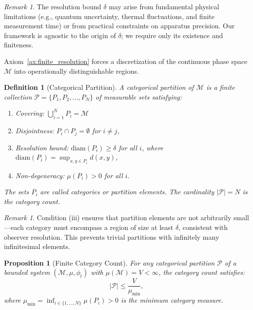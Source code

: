 \documentclass[twocolumn,10pt,a4paper]{article}
\newtheorem{proposition}[theorem]{Proposition}
\newtheorem{definition}[theorem]{Definition}
\theoremstyle{remark}
\newtheorem{remark}[theorem]{Remark}
\newcommand{\manifold}{\mathcal{M}}
\newcommand{\partition}{\mathcal{P}}
\begin{document}
\begin{remark}
The resolution bound $\delta$ may arise from fundamental physical limitations (e.g., quantum uncertainty, thermal fluctuations, and finite measurement time) or from practical constraints on apparatus precision. Our framework is agnostic to the origin of $\delta$; we require only its existence and finiteness.
\end{remark}

Axiom~\ref{ax:finite_resolution} forces a discretization of the continuous phase space $\manifold$ into operationally distinguishable regions.

\begin{definition}[Categorical Partition]
\label{def:categorical_partition}
A \emph{categorical partition} of $\manifold$ is a finite collection $\partition = \{P_1, P_2, \ldots, P_N\}$ of measurable sets satisfying:
\begin{enumerate}[label=(\roman*), noitemsep]
    \item \emph{Covering}: $\bigcup_{i=1}^N P_i = \manifold$
    \item \emph{Disjointness}: $P_i \cap P_j = \emptyset$ for $i \neq j$,
    \item \emph{Resolution bound}: $\text{diam}(P_i) \geq \delta$ for all $i$, where $\text{diam}(P_i) = \sup_{x,y \in P_i} d(x,y)$,
    \item \emph{Non-degeneracy}: $\mu(P_i) > 0$ for all $i$.
\end{enumerate}
The sets $P_i$ are called \emph{categories} or \emph{partition elements}. The cardinality $|\partition| = N$ is the \emph{category count}.
\end{definition}

\begin{remark}
Condition (iii) ensures that partition elements are not arbitrarily small—each category must encompass a region of size at least $\delta$, consistent with observer resolution. This prevents trivial partitions with infinitely many infinitesimal elements.
\end{remark}

\begin{proposition}[Finite Category Count]
\label{prop:finite_categories}
For any categorical partition $\partition$ of a bounded system $(\manifold, \mu, \phi_t)$ with $\mu(\manifold) = V < \infty$, the category count satisfies:
\begin{equation}
|\partition| \leq \frac{V}{\mu_{\min}},
\end{equation}
where $\mu_{\min} = \inf_{i \in \{1,\ldots,N\}} \mu(P_i) > 0$ is the minimum category measure.
\end{proposition}
\end{document}
